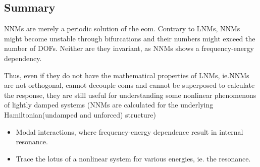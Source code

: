 


\subsection{Summary}

NNMs are merely a periodic solution of the eom. Contrary to LNMs, NNMs might
become unstable through bifurcations and their numbers might exceed the number
of DOFs. Neither are they invariant, as NNMs shows a frequency-energy
dependency.

Thus, even if they do not have the mathematical properties of LNMs, ie.NNMs are
not orthogonal, cannot decouple eoms and cannot be superposed to calculate the
response, they are still useful for understanding some nonlinear phenomenons of
lightly damped systems (NNMs are calculated for the underlying
Hamiltonian(undamped and unforced) structure)

\begin{itemize}
\item Modal interactions, where frequency-energy dependence result in internal
  resonance.
\item Trace the lotus of a nonlinear system for various energies, ie. the
  resonance.
\end{itemize}



